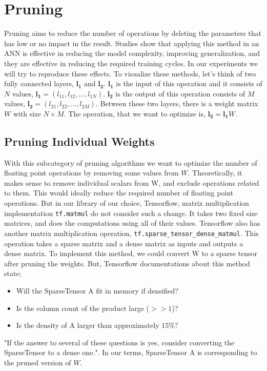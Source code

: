 \section{Pruning}
Pruning aims to reduce the number of operations by deleting the parameters that has low or no impact in the result. Studies show that applying this method in an ANN is effective in reducing the model complexity, improving generalization, and they are effective in reducing the required training cycles. In our experiments we will try to reproduce these effects.
To visualize these methods, let's think of two fully connected layers, $\mathbf{l_1}$ and $\mathbf{l_2}$. $\mathbf{l_1}$ is the input of this operation and it consists of $N$ values, $\mathbf{l_1}=(l_{11}, l_{12}, ..., l_{1N})$. $\mathbf{l_2}$ is the output of this operation consists of $M$ values, $\mathbf{l_2}=(l_{21}, l_{22}, ..., l_{2M})$. Between these two layers, there is a weight matrix $W$ with size $N \times M$. The operation, that we want to optimize is, $\mathbf{l_2} = \mathbf{l_1}W$.

\subsection{Pruning Individual Weights}
With this subcategory of pruning algorithms we want to optimize the number of floating point operations by removing some values from $W$. Theoretically, it makes sense to remove individual scalars from W, and exclude operations related to them. This would ideally reduce the required number of floating point operations. But in our library of our choice, Tensorflow, matrix multiplication implementation \texttt{tf.matmul} do not consider such a change. It takes two fixed size matrices, and does the computations using all of their values. Tensorflow also has another matrix multiplication operation, \texttt{tf.sparse\_tensor\_dense\_matmul}. This operation takes a sparse matrix and a dense matrix as inputs and outputs a dense matrix. To implement this method, we could convert W to a sparse tensor after pruning the weights. But, Tensorflow documentations about this method state;
\begin{itemize}
\item Will the SparseTensor A fit in memory if densified?
\item Is the column count of the product large ($>> 1$)?
\item Is the density of A larger than approximately $15\%$?
\end{itemize}
"If the answer to several of these questions is yes, consider converting the SparseTensor to a dense one.". In our terms, SparseTensor A is corresponding to the pruned version of $W$. 

